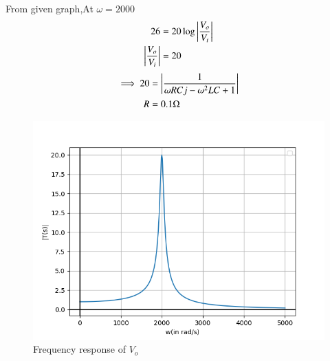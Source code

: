 \documentclass[journal,12pt,twocolumn]{IEEEtran}
\theoremstyle{remark}
\begin{document}
From given graph,At $\omega = 2000$
\begin{align}
    26 &= 20 \log \left\vert\frac{V_o}{V_i}\right\vert\\
    \left\vert\frac{V_o}{V_i}\right\vert &= 20
\end{align}
\begin{align}
    \implies 20 &= \left\vert\frac{1}{\omega RCj -\omega^2LC + 1}\right\vert \\
    R &= 0.1 \Omega
\end{align}
\begin{figure}[!h]
    \centering
    \includegraphics[width=\columnwidth]{figs/frequency_response.png}
    \caption{Frequency response of $V_o$}
    \label{frequency_response_2021_EE_20}
\end{figure}
\end{document}
